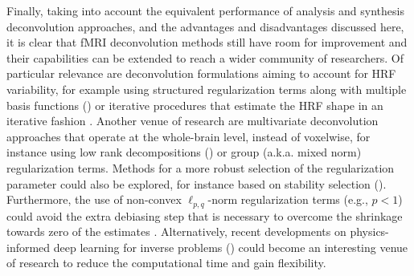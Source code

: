 Finally, taking into account the equivalent performance of analysis and synthesis deconvolution approaches, and the advantages and disadvantages discussed here, it is clear that fMRI deconvolution methods still have room for improvement and their capabilities can be extended to reach a wider community of researchers. Of particular relevance are deconvolution formulations aiming to account for HRF variability, for example using structured regularization terms along with multiple basis functions (\citealt{Gaudes2012Structuredsparsedeconvolution}) or iterative procedures that estimate the HRF shape in an iterative fashion \citealt{Farouj2019BoldSignalDeconvolution,cherkaoui:hal-03005584}. Another venue of research are multivariate deconvolution approaches that operate at the whole-brain level, instead of voxelwise, for instance using low rank decompositions (\citealt{cherkaoui:hal-03005584}) or group (a.k.a. mixed norm) regularization terms. Methods for a more robust selection of the regularization parameter could also be explored, for instance based on stability selection (\citealt{Meinshausen2010Stabilityselection,Urunuela2020StabilityBasedSparse}). Furthermore, the use of non-convex \(\ell_{p,q}\)-norm regularization terms (e.g., \(p < 1\)) could avoid the extra debiasing step that is necessary to overcome the shrinkage towards zero of the estimates \citealt{Gaudes2013Paradigmfreemapping,CaballeroGaudes2019deconvolutionalgorithmmulti}. Alternatively, recent developments on physics-informed deep learning for inverse problems (\citealt{Akcakaya2021,Monga2021,Ongie2020}) could become an interesting venue of research to reduce the computational time and gain flexibility.